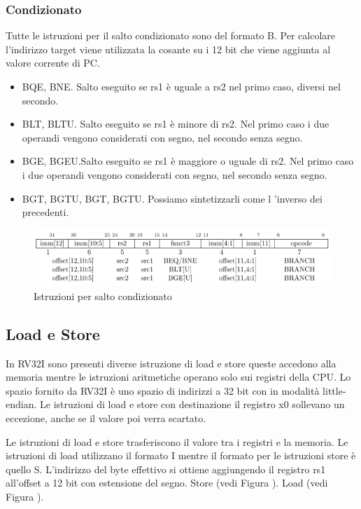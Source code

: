 \documentclass[12pt,a4paper]{report}
\begin{document}
\subsubsection{Condizionato}
Tutte le istruzioni per il salto condizionato sono del formato B. Per calcolare l'indirizzo target viene utilizzata la cosante su i 12 bit che viene aggiunta al valore corrente di PC.
\begin{itemize}
	\item BQE, BNE. Salto eseguito se rs1 è uguale a rs2 nel primo caso,  diversi nel secondo.
	\item BLT, BLTU. Salto eseguito se rs1 è minore di rs2. Nel primo caso i due operandi vengono considerati con segno, nel secondo senza segno.
	\item BGE, BGEU.Salto eseguito se rs1 è maggiore o uguale di rs2. Nel primo caso i due operandi vengono considerati con segno, nel secondo senza segno.
	\item BGT, BGTU, BGT, BGTU.  Possiamo sintetizzarli come l 'inverso dei precedenti.
\end{itemize}
\begin{figure}
	\includegraphics[width = \textwidth]{Istruzioni/Istruction6.png}
	\caption{Istruzioni per salto condizionato}
		\label{Fig:Istruzioni_saltoCondizionato}
\end{figure}

\subsection{Load e Store}
In RV32I  sono presenti diverse istruzione di load e store queste accedono  alla memoria mentre le istruzioni aritmetiche operano solo sui registri della CPU. Lo spazio fornito da RV32I è uno spazio di indirizzi  a 32 bit con in modalità little-endian.  Le istruzioni di load e store con destinazione il registro x0 sollevano un eccezione, anche se il valore poi verra scartato.

Le istruzioni di load e store trasferiscono il valore tra i registri e la memoria. Le istruzioni di load utilizzano il formato I mentre il formato per le istruzioni store è quello S. L'indirizzo del byte effettivo si ottiene aggiungendo il registro rs1 all'offset a 12 bit con estensione del segno. 
Store (vedi Figura ). Load (vedi Figura ).
\end{document}
